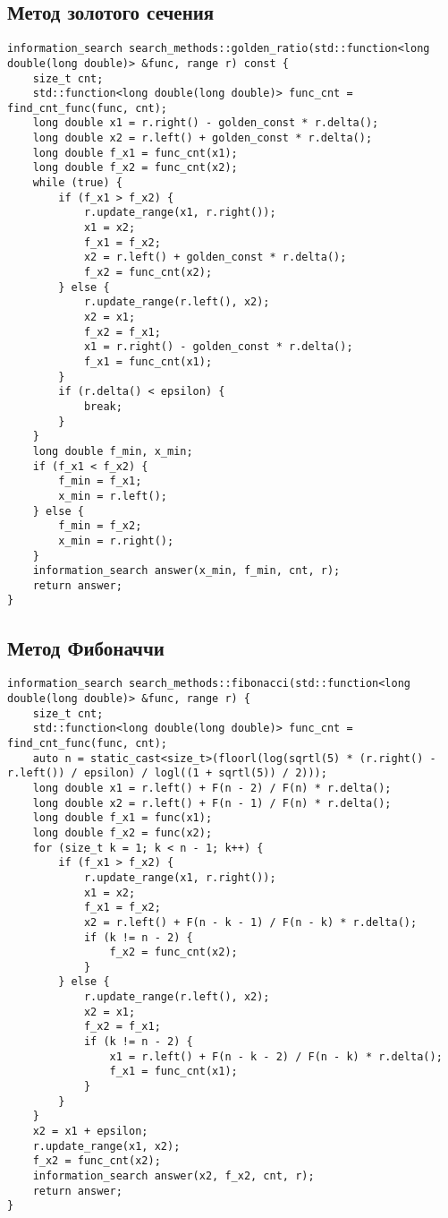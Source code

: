 \newpage
\subsection {Метод золотого сечения}

\begin{lstlisting}
information_search search_methods::golden_ratio(std::function<long double(long double)> &func, range r) const {
    size_t cnt;
    std::function<long double(long double)> func_cnt = find_cnt_func(func, cnt);
    long double x1 = r.right() - golden_const * r.delta();
    long double x2 = r.left() + golden_const * r.delta();
    long double f_x1 = func_cnt(x1);
    long double f_x2 = func_cnt(x2);
    while (true) {
        if (f_x1 > f_x2) {
            r.update_range(x1, r.right());
            x1 = x2;
            f_x1 = f_x2;
            x2 = r.left() + golden_const * r.delta();
            f_x2 = func_cnt(x2);
        } else {
            r.update_range(r.left(), x2);
            x2 = x1;
            f_x2 = f_x1;
            x1 = r.right() - golden_const * r.delta();
            f_x1 = func_cnt(x1);
        }
        if (r.delta() < epsilon) {
            break;
        }
    }
    long double f_min, x_min;
    if (f_x1 < f_x2) {
        f_min = f_x1;
        x_min = r.left();
    } else {
        f_min = f_x2;
        x_min = r.right();
    }
    information_search answer(x_min, f_min, cnt, r);
    return answer;
}
\end{lstlisting}


\newpage
\subsection {Метод Фибоначчи} 
\begin{lstlisting}
information_search search_methods::fibonacci(std::function<long double(long double)> &func, range r) {
    size_t cnt;
    std::function<long double(long double)> func_cnt = find_cnt_func(func, cnt);
    auto n = static_cast<size_t>(floorl(log(sqrtl(5) * (r.right() - r.left()) / epsilon) / logl((1 + sqrtl(5)) / 2)));
    long double x1 = r.left() + F(n - 2) / F(n) * r.delta();
    long double x2 = r.left() + F(n - 1) / F(n) * r.delta();
    long double f_x1 = func(x1);
    long double f_x2 = func(x2);
    for (size_t k = 1; k < n - 1; k++) {
        if (f_x1 > f_x2) {
            r.update_range(x1, r.right());
            x1 = x2;
            f_x1 = f_x2;
            x2 = r.left() + F(n - k - 1) / F(n - k) * r.delta();
            if (k != n - 2) {
                f_x2 = func_cnt(x2);
            }
        } else {
            r.update_range(r.left(), x2);
            x2 = x1;
            f_x2 = f_x1;
            if (k != n - 2) {
                x1 = r.left() + F(n - k - 2) / F(n - k) * r.delta();
                f_x1 = func_cnt(x1);
            }
        }
    }
    x2 = x1 + epsilon;
    r.update_range(x1, x2);
    f_x2 = func_cnt(x2);
    information_search answer(x2, f_x2, cnt, r);
    return answer;
}
\end{lstlisting}
	

